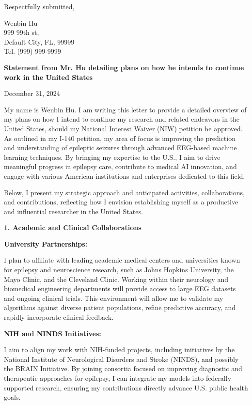 \documentclass{article}
\begin{document}
Respectfully submitted,

\vspace{5\baselineskip}

Wenbin Hu\\
999 99th st,\\
Default City, FL, 99999\\
Tel. (999) 999-9999




\clearpage

{\bf Statement from Mr. Hu detailing plans on how he intends to continue work in the United States}

\label{plans}
December 31, 2024

My name is Wenbin Hu. I am writing this letter to provide a detailed overview of my plans on how I intend to continue my research and related endeavors in the United States, should my National Interest Waiver (NIW) petition be approved. As outlined in my I-140 petition, my area of focus is improving the prediction and understanding of epileptic seizures through advanced EEG-based machine learning techniques. By bringing my expertise to the U.S., I aim to drive meaningful progress in epilepsy care, contribute to medical AI innovation, and engage with various American institutions and enterprises dedicated to this field.

Below, I present my strategic approach and anticipated activities, collaborations, and contributions, reflecting how I envision establishing myself as a productive and influential researcher in the United States.


{\bf 1. Academic and Clinical Collaborations }

{\bf University Partnerships: }

I plan to affiliate with leading academic medical centers and universities known for epilepsy and neuroscience research, such as Johns Hopkins University, the Mayo Clinic, and the Cleveland Clinic. Working within their neurology and biomedical engineering departments will provide access to large EEG datasets and ongoing clinical trials. This environment will allow me to validate my algorithms against diverse patient populations, refine predictive accuracy, and rapidly incorporate clinical feedback.

{\bf NIH and NINDS Initiatives: }

I aim to align my work with NIH-funded projects, including initiatives by the National Institute of Neurological Disorders and Stroke (NINDS), and possibly the BRAIN Initiative. By joining consortia focused on improving diagnostic and therapeutic approaches for epilepsy, I can integrate my models into federally supported research, ensuring my contributions directly advance U.S. public health goals.
\end{document}
